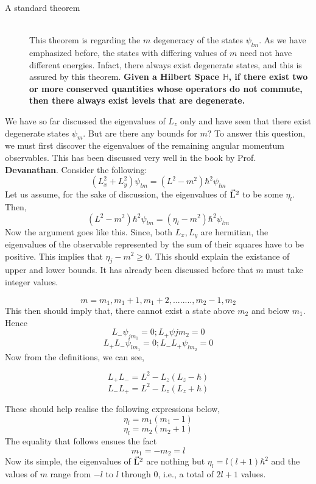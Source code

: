 \documentclass[12pt]{article}
\begin{document}
\begin{description}
\item[A standard theorem] \hfill \\
	This theorem is regarding the $m$ degeneracy of the states $\psi_{lm}$. As we have emphasized before, the states with differing values of $m$ need not have different energies. Infact, there always exist degenerate states, and this is assured by this theorem. \textbf{Given a Hilbert Space $\mathbb{H}$, if there exist two or more conserved quantities whose operators do not commute, then there always exist levels that are degenerate.} 
\end{description}
We have so far discussed the eigenvalues of $L_z$ only and have seen that there exist degenerate states $\psi_m$. But are there any bounds for $m$? To answer this question, we must first discover the eigenvalues of the remaining angular momentum observables. This has been discussed very well in the book by Prof. \textbf{Devanathan}. Consider the following:
$$(L_x^2 + L_y^2)\psi_{lm} = (L^2 - m^2)\hbar^2 \psi_{lm}$$
Let us assume, for the sake of discussion, the eigenvalues of \textbf{$\vec{\mathrm{L}}^2$} to be some $\eta_l$. Then,
$$ (L^2 - m^2)\hbar^2 \psi_{lm} = (\eta_l - m^2)\hbar^2\psi_{lm}$$
Now the argument goes like this. Since, both $L_x, L_y$ are hermitian, the eigenvalues of the observable represented by the sum of their squares have to be positive. This implies that $\eta_j - m^2 \geq 0$. This should explain the existance of upper and lower bounds. It has already been discussed before that $m$ must take integer values.

$$m = m_1, m_1 + 1, m_1 + 2, ........, m_2 - 1,m_2$$
This then should imply that, there cannot exist a state above $m_2$ and below $m_1$. Hence $$L_-\psi_{jm_1} = 0; L_+\psi{jm_2} = 0$$
$$L_+L_-\psi_{lm_1} = 0; L_-L_+\psi_{lm_2}=0$$
Now from the definitions, we can see,

$$L_+L_- = L^2 - L_z(L_z - \hbar)$$
$$L_-L_+ = L^2 - L_z(L_z +\hbar)$$

These should help realise the following expressions below,
$$\eta_l = m_1(m_1-1)$$
$$\eta_l = m_2(m_2+1)$$
The equality that follows ensues the fact $$m_1 = -m_2 = l$$ Now its simple, the eigenvalues of \textbf{$\vec{\mathrm{L}}^2$} are nothing but $\eta_l = l(l+1)\hbar^2$ and the values of $m$ range from $-l$ to $l$ through 0, i.e., a total of $2l+1$ values.
\end{document}
